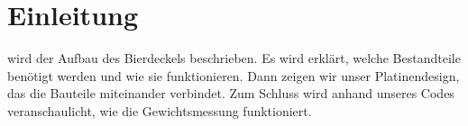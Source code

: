 \documentclass[12pt,journal]{IEEEtran}
\begin{document}
\section{Einleitung}

% 
% 
% 
% 
 wird der Aufbau des Bierdeckels beschrieben.
Es wird erklärt, welche Bestandteile benötigt werden und wie sie funktionieren.
Dann zeigen wir unser Platinendesign, das die Bauteile miteinander verbindet.
Zum Schluss wird anhand unseres Codes veranschaulicht, wie die Gewichtsmessung funktioniert.
\end{document}
